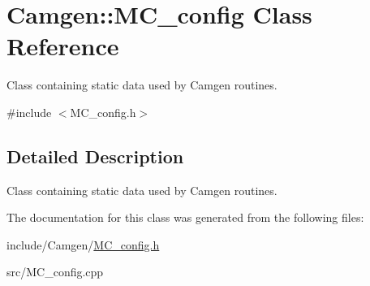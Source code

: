 \hypertarget{a00365}{}\section{Camgen\+:\+:M\+C\+\_\+config Class Reference}
\label{a00365}


Class containing static data used by Camgen routines.  




{\ttfamily \#include $<$M\+C\+\_\+config.\+h$>$}



\subsection{Detailed Description}
Class containing static data used by Camgen routines. 

The documentation for this class was generated from the following files\+:\begin{DoxyCompactItemize}
\item 
include/\+Camgen/\hyperlink{a00690}{M\+C\+\_\+config.\+h}\item 
src/M\+C\+\_\+config.\+cpp\end{DoxyCompactItemize}
